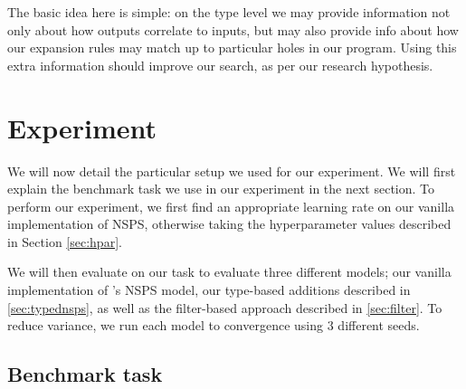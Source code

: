 \documentclass{article}
\begin{document}
The basic idea here is simple:
on the type level we may provide information not only about how outputs correlate to inputs,
but may also provide info about how our expansion rules may match up to particular holes in our program.
Using this extra information should improve our search,
as per our research hypothesis. %


\section{Experiment} \label{sec:experiment}

We will now detail the particular setup we used for our experiment.
We will first explain the benchmark task we use in our experiment in
the next section.
To perform our experiment, we
first find an appropriate learning rate on our vanilla implementation of NSPS,
otherwise taking the hyperparameter values described in Section \ref{sec:hpar}.

We will then evaluate on our task to evaluate three different models;
our vanilla implementation of \citet{nsps}'s NSPS model,
our type-based additions described in \ref{sec:typednsps},
as well as the filter-based approach described in \ref{sec:filter}.
To reduce variance, we run each model to convergence using $3$ different seeds.

\subsection{Benchmark task} \label{sec:task}
\end{document}
